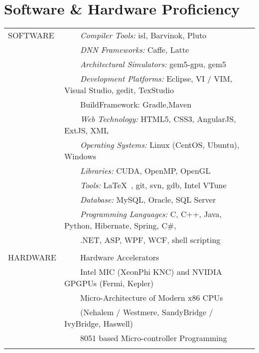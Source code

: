 \documentclass[a4paper,10pt]{article} %
\newcommand{\tabitem}{~~\llap{\textbullet}~~}
\begin{document}
\section{Software \& Hardware Proficiency}
\begin{tabular}{p{3cm}l}
SOFTWARE & \tabitem \textit{Compiler Tools:} isl, Barvinok, Pluto\\
& \tabitem \textit{DNN Frameworks:} Caffe, Latte\\
& \tabitem \textit{Architectural Simulators:} gem5-gpu, gem5\\
& \tabitem \textit{Development Platforms:} Eclipse, VI / VIM, Visual Studio, gedit, TexStudio\\
& \tabitem{BuildFramework:} Gradle,Maven \\
& \tabitem \textit{Web Technology:} HTML5, CSS3, AngularJS, ExtJS, XML\\
& \tabitem \textit{Operating Systems:} Linux (CentOS, Ubuntu), Windows \\
& \tabitem \textit{Libraries:} CUDA, OpenMP, OpenGL  \\
& \tabitem \textit{Tools:} \LaTeX\ , git, svn, gdb, Intel VTune\\
& \tabitem \textit{Database:} MySQL, Oracle, SQL Server\\
& \tabitem \textit{Programming Languages:} C, C++, Java, Python, Hibernate, Spring, C\#, \\
& ~~~~.NET, ASP, WPF, WCF, shell scripting\\

&\\

HARDWARE  & \tabitem Hardware Accelerators \\
& ~~~~Intel MIC (XeonPhi KNC) and NVIDIA GPGPUs (Fermi, Kepler) \\
& \tabitem Micro-Architecture of Modern x86 CPUs\\
& ~~~~(Nehalem / Westmere, SandyBridge / IvyBridge, Haswell) \\ 
& \tabitem 8051 based Micro-controller Programming \\
&\\
\end{tabular}
\\
\\

\end{document}
